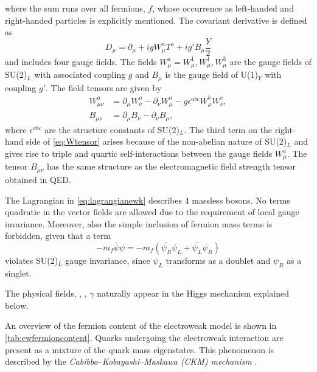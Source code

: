 where the sum runs over all fermions, $f$, whose occurrence as left-handed and right-handed particles is explicitly mentioned.
The covariant derivative is defined as
\begin{equation}
  D_\mu = \partial_\mu + igW_\mu^aT^a + ig'B_\mu \frac{Y}{2}
  \label{eq:covdevewk}
\end{equation}
and includes four gauge fields. The fields $W^a_\mu = W^1_\mu, W^1_\mu, W^3_\mu$ are the gauge fields of SU(2)$_L$ with associated coupling $g$ and $B_\mu$ is the gauge field of U(1)$_Y$ with coupling $g'$.
The field tensors are given by
\begin{align}
  W_{\mu\nu}^a & = \partial_\mu W_\nu^a - \partial_\nu W_\mu^a - g \epsilon^{abc} W^b_\mu W^c_\nu, \label{eq:Wtensor} \\
  B_{\mu\nu}   & = \partial_\mu B_\nu - \partial_\nu B_\mu,
\end{align}
where $\epsilon^{abc}$ are the structure constants of SU(2)$_L$. The third term on the right-hand side of \cref{eq:Wtensor} arises because of the non-abelian nature of SU(2)$_L$ and gives rise to triple and quartic self-interactions between the gauge fields $W_{\mu}^a$.
The tensor $B_{\mu\nu}$ has the same structure as the electromagnetic field strength tensor obtained in QED.

The Lagrangian in \cref{eq:lagrangianewk} describes 4 massless bosons. No terms quadratic in the vector fields are allowed due to the requirement of local gauge invariance. Moreover, also the simple inclusion of fermion mass terms is forbidden, given that a term
\begin{equation}
  -m_f \bar{\psi} \psi = -m_f \left( \bar{\psi_R}\psi_L + \bar{\psi_L}\psi_R \right)
  \label{eq:fermionmassterm}
\end{equation}
violates SU(2)$_L$ gauge invariance, since $\psi_L$ transforms as a doublet and $\psi_R$ as a singlet.

The physical fields, \Wpm, \Zboson, $\gamma$ naturally appear in the Higgs mechanism explained below.



An overview of the fermion content of the electroweak model is shown in \cref{tab:ewfermioncontent}. Quarks undergoing the electroweak interaction are present as a mixture of the quark mass eigenstates. This phenomenon is described by the \emph{Cabibbo–Kobayashi–Maskawa (CKM) mechanism} \cite{doi:10.1143/PTP.49.652}.









